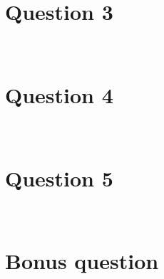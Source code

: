 \documentclass[11pt,a4paper,oneside]{article}
\begin{document}
\section{Question 3}
\label{Q3}
\textit{}\\

\section{Question 4}
\label{Q4}
\textit{}\\

\section{Question 5}
\label{Q5}
\textit{}\\

\section{Bonus question}
\label{bonus}
\textit{}\\

\clearpage 
\printbibliography
\end{document}

